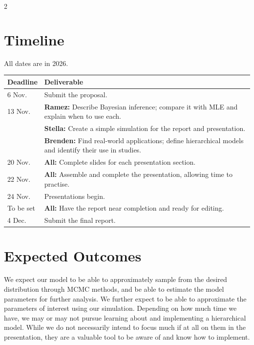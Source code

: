 \documentclass[10pt]{article}
\begin{document}
\begin{multicols*}{2}
\section*{Timeline}
All dates are in 2026.

\medskip
\begingroup
\small
\setlength{\tabcolsep}{4pt}
\renewcommand{\arraystretch}{1.15}
\noindent\begin{tabularx}{\linewidth}{@{}p{1.5cm}>{\raggedright\arraybackslash}X@{}}
\hline
\textbf{Deadline} & \textbf{Deliverable} \\ \hline
6 Nov. & Submit the proposal. \\[5pt]
13 Nov. & \textbf{Ramez:} Describe Bayesian inference; compare it with MLE and explain when to use each. \\[3pt]
 & \textbf{Stella:} Create a simple simulation for the report and presentation. \\[3pt]
 & \textbf{Brenden:} Find real-world applications; define hierarchical models and identify their use in studies. \\[5pt]
20 Nov. & \textbf{All:} Complete slides for each presentation section. \\[5pt]
22 Nov. & \textbf{All:} Assemble and complete the presentation, allowing time to practise. \\[5pt]
24 Nov. & Presentations begin. \\[5pt]
To be set & \textbf{All:} Have the report near completion and ready for editing. \\[5pt]
4 Dec. & Submit the final report. \\ \hline
\end{tabularx}
\par
\endgroup
\section*{Expected Outcomes}

We  expect our model to be able to approximately sample from the desired distribution through MCMC methods, 
and be able to estimate the model parameters for further analysis.
We further expect to be able to approximate the parameters of interest using our simulation.
Depending on how much time we have, we may or may not pursue learning about and implementing a hierarchical model.
While we do not necessarily intend to focus much if at all on them in the presentation, they are a valuable tool to be aware of and know how to implement.


\end{multicols*}


	
\end{document}
